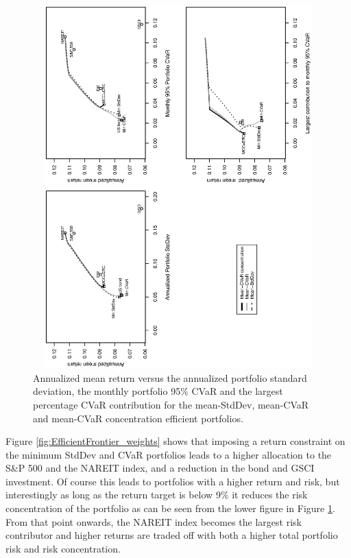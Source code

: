 \documentclass[12pt,a4paper]{article}
\begin{document}
\begin{figure}[tb]
\caption{Annualized mean return versus the annualized portfolio standard deviation, the monthly portfolio 95\% CVaR and the largest percentage CVaR contribution for the mean-StdDev, mean-CVaR and mean-CVaR concentration efficient
portfolios.  \label{fig:EfficientFrontier}}
\includegraphics[width=16cm,height=14cm,angle=270]{frontier_fourassets_tris_clean.eps}
\end{figure}


Figure \ref{fig:EfficientFrontier_weights} shows that imposing a return constraint on the minimum StdDev and CVaR portfolios leads to a higher allocation to the S\&P 500 and the NAREIT index, and a reduction in the bond and GSCI investment. Of course this leads to portfolios with a higher return and risk, but interestingly as long as the return target is below 9\% it reduces the risk concentration of the portfolio as can be seen from the lower figure in Figure \ref{fig:EfficientFrontier}. From that point onwards, the NAREIT index becomes the largest risk contributor and higher returns are traded off with both a higher total portfolio risk and risk concentration.

\end{document}
